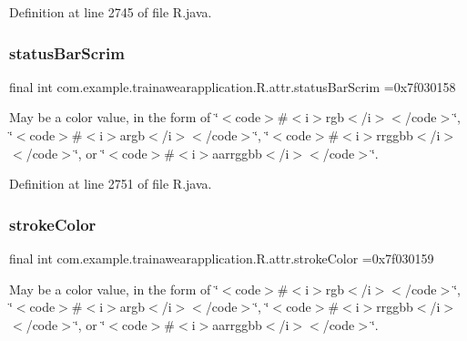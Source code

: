Definition at line 2745 of file R.\+java.

\mbox{\label{classcom_1_1example_1_1trainawearapplication_1_1_r_1_1attr_afbf9816fafd09b2a2987b42150919fb3}} 
\subsubsection{\texorpdfstring{statusBarScrim}{statusBarScrim}}
{\footnotesize\ttfamily final int com.\+example.\+trainawearapplication.\+R.\+attr.\+status\+Bar\+Scrim =0x7f030158\hspace{0.3cm}{\ttfamily [static]}}

May be a color value, in the form of \char`\"{}$<$code$>$\#$<$i$>$rgb$<$/i$>$$<$/code$>$\char`\"{}, \char`\"{}$<$code$>$\#$<$i$>$argb$<$/i$>$$<$/code$>$\char`\"{}, \char`\"{}$<$code$>$\#$<$i$>$rrggbb$<$/i$>$$<$/code$>$\char`\"{}, or \char`\"{}$<$code$>$\#$<$i$>$aarrggbb$<$/i$>$$<$/code$>$\char`\"{}. 

Definition at line 2751 of file R.\+java.

\mbox{\label{classcom_1_1example_1_1trainawearapplication_1_1_r_1_1attr_a0e5a40e42df2c80948977bb6b835b601}} 
\subsubsection{\texorpdfstring{strokeColor}{strokeColor}}
{\footnotesize\ttfamily final int com.\+example.\+trainawearapplication.\+R.\+attr.\+stroke\+Color =0x7f030159\hspace{0.3cm}{\ttfamily [static]}}

May be a color value, in the form of \char`\"{}$<$code$>$\#$<$i$>$rgb$<$/i$>$$<$/code$>$\char`\"{}, \char`\"{}$<$code$>$\#$<$i$>$argb$<$/i$>$$<$/code$>$\char`\"{}, \char`\"{}$<$code$>$\#$<$i$>$rrggbb$<$/i$>$$<$/code$>$\char`\"{}, or \char`\"{}$<$code$>$\#$<$i$>$aarrggbb$<$/i$>$$<$/code$>$\char`\"{}. 

